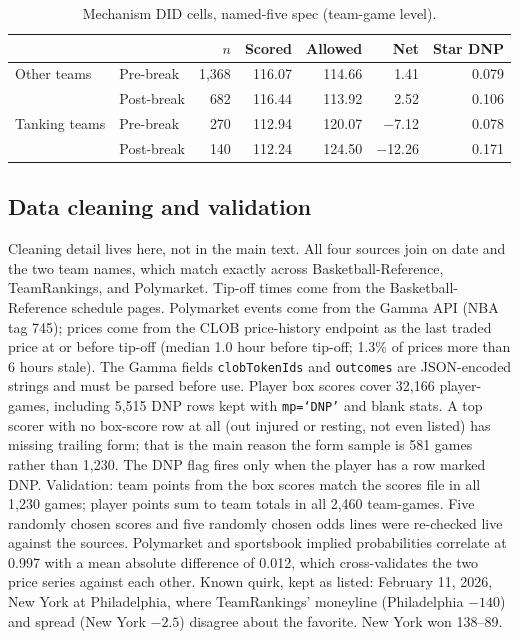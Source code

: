 \documentclass[12pt,letterpaper]{article}
\begin{document}
\begin{table}[htbp]
\centering
\caption{Mechanism DID cells, named-five spec (team-game level).}
\label{tab:mechanism-named}
\begin{tabular}{llrrrrr}
\hline
& & $n$ & Scored & Allowed & Net & Star DNP \\
\hline
Other teams & Pre-break & 1,368 & 116.07 & 114.66 & 1.41 & 0.079 \\
& Post-break & 682 & 116.44 & 113.92 & 2.52 & 0.106 \\
Tanking teams & Pre-break & 270 & 112.94 & 120.07 & $-$7.12 & 0.078 \\
& Post-break & 140 & 112.24 & 124.50 & $-$12.26 & 0.171 \\
\hline
\end{tabular}
\end{table}

\subsection{Data cleaning and validation}

Cleaning detail lives here, not in the main text. All four sources join on
date and the two team names, which match exactly across Basketball-Reference,
TeamRankings, and Polymarket. Tip-off times come from the
Basketball-Reference schedule pages. Polymarket events come from the Gamma
API (NBA tag 745); prices come from the CLOB price-history endpoint as the
last traded price at or before tip-off (median 1.0 hour before tip-off; 1.3\%
of prices more than 6 hours stale). The Gamma fields \texttt{clobTokenIds}
and \texttt{outcomes} are JSON-encoded strings and must be parsed before use.
Player box scores cover 32,166 player-games, including 5,515 DNP rows kept
with \texttt{mp=`DNP'} and blank stats. A top scorer with no box-score row at
all (out injured or resting, not even listed) has missing trailing form; that
is the main reason the form sample is 581 games rather than 1,230. The DNP
flag fires only when the player has a row marked DNP. Validation: team points
from the box scores match the scores file in all 1,230 games; player points
sum to team totals in all 2,460 team-games. Five randomly chosen scores and
five randomly chosen odds lines were re-checked live against the sources.
Polymarket and sportsbook implied probabilities correlate at 0.997 with a
mean absolute difference of 0.012, which cross-validates the two price series
against each other. Known quirk, kept as listed: February 11, 2026, New York
at Philadelphia, where TeamRankings' moneyline (Philadelphia $-140$) and
spread (New York $-2.5$) disagree about the favorite. New York won 138--89.
\end{document}
